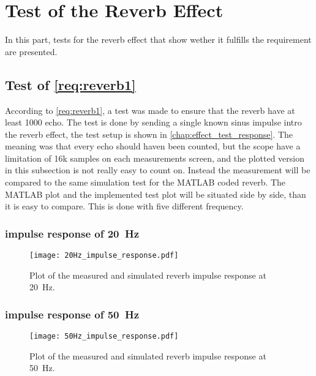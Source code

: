 \newpage
\section{Test of the Reverb Effect}
In this part, tests for the reverb effect that show wether it fulfills the requirement are presented. 


\subsection{Test of \autoref{req:reverb1}}
According to \autoref{req:reverb1}, a test was made to ensure that the \gls{reverb} have at least 1000 echo. The test is done by sending a single known sinus impulse intro the \gls{reverb} effect, the test setup is shown in \autoref{chap:effect_test_response}. The meaning was that every echo should haven been counted, but the scope have a limitation of 16k samples on each measurements screen, and the plotted version in this subsection is not really easy to count on. Instead the measurement will be compared to the same simulation test for the MATLAB coded \gls{reverb}. The MATLAB plot and the implemented test plot will be situated side by side, than it is easy to compare. This is done with five different frequency. 

\subsubsection*{impulse response of \SI{20}{\hertz}}


\begin{figure}[htbp!]
    \centering
        \texttt{[image: 20Hz\_impulse\_response.pdf]}
        \caption{Plot of the measured and simulated \gls{reverb} impulse response at \SI{20}{\hertz}.}
        \label{fig:tests:reverb:20Hz}
  \end{figure}
  
  \newpage
  
\subsubsection*{impulse response of \SI{50}{\hertz}}

\begin{figure}[htbp!]
    \centering
        \texttt{[image: 50Hz\_impulse\_response.pdf]}
        \caption{Plot of the measured and simulated \gls{reverb} impulse response at \SI{50}{\hertz}.}
        \label{fig:tests:reverb:50Hz}
  \end{figure}

